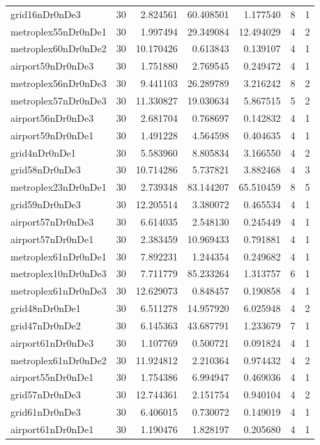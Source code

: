 \documentclass[../../../thesis.tex]{subfiles}
\begin{document}
\begin{longtable}{|l|r|r|r|r|r|r|}
grid16nDr0nDe3 & 30 & 2.824561 & 60.408501 & 1.177540 & 8 & 1 \\
metroplex55nDr0nDe1 & 30 & 1.997494 & 29.349084 & 12.494029 & 4 & 2 \\
metroplex60nDr0nDe2 & 30 & 10.170426 & 0.613843 & 0.139107 & 4 & 1 \\
airport59nDr0nDe3 & 30 & 1.751880 & 2.769545 & 0.249472 & 4 & 1 \\
metroplex56nDr0nDe3 & 30 & 9.441103 & 26.289789 & 3.216242 & 8 & 2 \\
metroplex57nDr0nDe3 & 30 & 11.330827 & 19.030634 & 5.867515 & 5 & 2 \\
airport56nDr0nDe3 & 30 & 2.681704 & 0.768697 & 0.142832 & 4 & 1 \\
airport59nDr0nDe1 & 30 & 1.491228 & 4.564598 & 0.404635 & 4 & 1 \\
grid4nDr0nDe1 & 30 & 5.583960 & 8.805834 & 3.166550 & 4 & 2 \\
grid58nDr0nDe3 & 30 & 10.714286 & 5.737821 & 3.882468 & 4 & 3 \\
metroplex23nDr0nDe1 & 30 & 2.739348 & 83.144207 & 65.510459 & 8 & 5 \\
grid59nDr0nDe3 & 30 & 12.205514 & 3.380072 & 0.465534 & 4 & 1 \\
airport57nDr0nDe3 & 30 & 6.614035 & 2.548130 & 0.245449 & 4 & 1 \\
airport57nDr0nDe1 & 30 & 2.383459 & 10.969433 & 0.791881 & 4 & 1 \\
metroplex61nDr0nDe1 & 30 & 7.892231 & 1.244354 & 0.249682 & 4 & 1 \\
metroplex10nDr0nDe3 & 30 & 7.711779 & 85.233264 & 1.313757 & 6 & 1 \\
metroplex61nDr0nDe3 & 30 & 12.629073 & 0.848457 & 0.190858 & 4 & 1 \\
grid48nDr0nDe1 & 30 & 6.511278 & 14.957920 & 6.025948 & 4 & 2 \\
grid47nDr0nDe2 & 30 & 6.145363 & 43.687791 & 1.233679 & 7 & 1 \\
airport61nDr0nDe3 & 30 & 1.107769 & 0.500721 & 0.091824 & 4 & 1 \\
metroplex61nDr0nDe2 & 30 & 11.924812 & 2.210364 & 0.974432 & 4 & 2 \\
airport55nDr0nDe1 & 30 & 1.754386 & 6.994947 & 0.469036 & 4 & 1 \\
grid57nDr0nDe3 & 30 & 12.744361 & 2.151754 & 0.940104 & 4 & 2 \\
grid61nDr0nDe3 & 30 & 6.406015 & 0.730072 & 0.149019 & 4 & 1 \\
airport61nDr0nDe1 & 30 & 1.190476 & 1.828197 & 0.205680 & 4 & 1 \\

\end{longtable}
\end{document}
